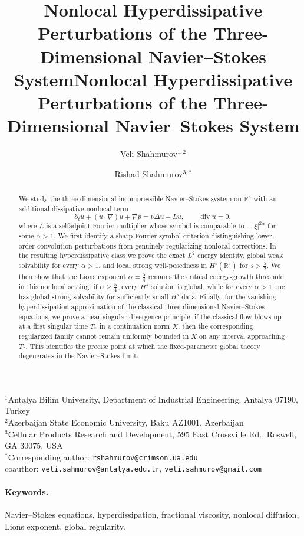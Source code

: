 \documentclass[11pt]{article}
\title{Nonlocal Hyperdissipative Perturbations of the Three-Dimensional Navier--Stokes System}
\title{Nonlocal Hyperdissipative Perturbations of the Three-Dimensional Navier--Stokes System}
\author{
	Veli Shahmurov$^{1,2}$ \and
	Rishad Shahmurov$^{3,*}$
}
\date{}
\theoremstyle{definition}
\theoremstyle{remark}
\newcommand{\R}{\mathbb{R}}
\newcommand{\diver}{\operatorname{div}}
\begin{document}
\maketitle
\begin{center}
		$^{1}$Antalya Bilim University, Department of Industrial Engineering, Antalya 07190, Turkey\\
	$^{2}$Azerbaijan State Economic University, Baku AZ1001, Azerbaijan\\[0.5em]
	$^{3}$Cellular Products Research and Development, 595 East Crossville Rd., Roswell, GA 30075, USA\\

	$^{*}$Corresponding author: \texttt{rshahmurov@crimson.ua.edu}\\
	 coauthor: \texttt{veli.sahmurov@antalya.edu.tr}, \texttt{veli.sahmurov@gmail.com}
\end{center}
\begin{abstract}
We study the three-dimensional incompressible Navier--Stokes system on $\R^3$ with an additional dissipative nonlocal term
\[
\partial_t u + (u\cdot\nabla)u + \nabla p = \nu \Delta u + Lu,
\qquad \diver u = 0,
\]
where $L$ is a selfadjoint Fourier multiplier whose symbol is comparable to $-|\xi|^{2\alpha}$ for some $\alpha>1$. We first identify a sharp Fourier-symbol criterion distinguishing lower-order convolution perturbations from genuinely regularizing nonlocal corrections. In the resulting hyperdissipative class we prove the exact $L^2$ energy identity, global weak solvability for every $\alpha>1$, and local strong well-posedness in $H^s(\R^3)$ for $s>\frac52$. We then show that the Lions exponent $\alpha=\frac54$ remains the critical energy-growth threshold in this nonlocal setting: if $\alpha\ge \frac54$, every $H^s$ solution is global, while for every $\alpha>1$ one has global strong solvability for sufficiently small $H^s$ data. Finally, for the vanishing-hyperdissipation approximation of the classical three-dimensional Navier--Stokes equations, we prove a near-singular divergence principle: if the classical flow blows up at a first singular time $T_*$ in a continuation norm $X$, then the corresponding regularized family cannot remain uniformly bounded in $X$ on any interval approaching $T_*$. This identifies the precise point at which the fixed-parameter global theory degenerates in the Navier--Stokes limit.
\end{abstract}

\paragraph{Keywords.} Navier--Stokes equations, hyperdissipation, fractional viscosity, nonlocal diffusion, Lions exponent, global regularity.
\end{document}
